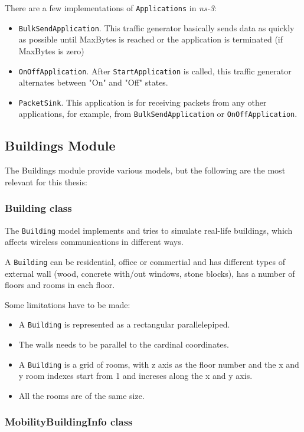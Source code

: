 There are a few implementations of \texttt{Applications} in \textit{ns-3}:
\begin{itemize}[topsep=0pt, itemsep=0pt]
  \item \texttt{BulkSendApplication}. This traffic generator basically sends data as quickly as possible
  until MaxBytes is reached or the application is terminated (if MaxBytes is zero)
  \item \texttt{OnOffApplication}. After \texttt{StartApplication} is called, this traffic generator 
  alternates between "On" and "Off" states.
  \item \texttt{PacketSink}. This application is for receiving packets from any other applications, for
  example, from \texttt{BulkSendApplication} or \texttt{OnOffApplication}.
\end{itemize}

\subsection{Buildings Module}
The Buildings module provide various models, but the following are the most relevant for this thesis:

\subsubsection{Building class}

The \texttt{Building} model implements and tries to simulate real-life buildings, which affects
wireless communications in different ways.

A \texttt{Building} can be residential, office or commertial and has different types of external
wall (wood, concrete with/out windows, stone blocks), has a number of floors and rooms in each floor.

Some limitations have to be made:
\begin{itemize}[topsep=0pt]
  \item A \texttt{Building} is represented as a rectangular parallelepiped.
  \item The walls needs to be parallel to the cardinal coordinates.
  \item A \texttt{Building} is a grid of rooms, with z axis as the floor number and the x and y room
  indexes start from 1 and increses along the x and y axis.
  \item All the rooms are of the same size.
\end{itemize}

\subsubsection{MobilityBuildingInfo class}

